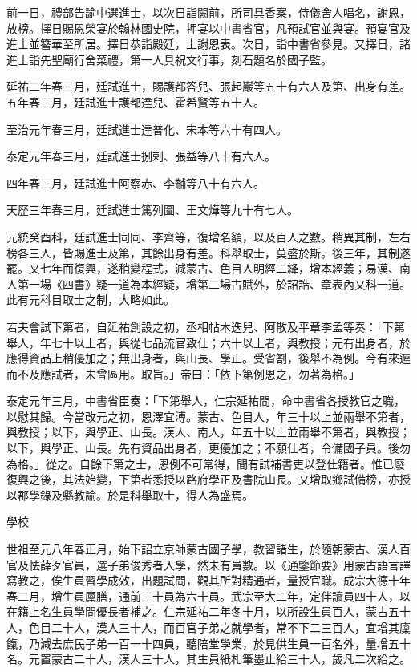 \begin{pinyinscope}
 前一日，禮部告諭中選進士，以次日詣闕前，所司具香案，侍儀舍人唱名，謝恩，放榜。擇日賜恩榮宴於翰林國史院，押宴以中書省官，凡預試官並與宴。預宴官及進士並簪華至所居。擇日恭詣殿廷，上謝恩表。次日，詣中書省參見。又擇日，諸進士詣先聖廟行舍菜禮，第一人具祝文行事，刻石題名於國子監。



 延祐二年春三月，廷試進士，賜護都答兒、張起巖等五十有六人及第、出身有差。五年春三月，廷試進士護都達兒、霍希賢等五十人。



 至治元年春三月，廷試進士達普化、宋本等六十有四人。



 泰定元年春三月，廷試進士捌剌、張益等八十有六人。



 四年春三月，廷試進士阿察赤、李黼等八十有六人。



 天歷三年春三月，廷試進士篤列圖、王文燁等九十有七人。



 元統癸酉科，廷試進士同同、李齊等，復增名額，以及百人之數。稍異其制，左右榜各三人，皆賜進士及第，其餘出身有差。科舉取士，莫盛於斯。後三年，其制遂罷。又七年而復興，遂稍變程式，減蒙古、色目人明經二絳，增本經義；易漢、南人第一場《四書》疑一道為本經疑，增第二場古賦外，於詔誥、章表內又科一道。此有元科目取士之制，大略如此。



 若夫會試下第者，自延祐創設之初，丞相帖木迭兒、阿散及平章李孟等奏：「下第舉人，年七十以上者，與從七品流官致仕；六十以上者，與教授；元有出身者，於應得資品上稍優加之；無出身者，與山長、學正。受省劄，後舉不為例。今有來遲而不及應試者，未曾區用。取旨。」帝曰：「依下第例恩之，勿著為格。」



 泰定元年三月，中書省臣奏：「下第舉人，仁宗延祐間，命中書省各授教官之職，以慰其歸。今當改元之初，恩澤宜溥。蒙古、色目人，年三十以上並兩舉不第者，與教授；以下，與學正、山長。漢人、南人，年五十以上並兩舉不第者，與教授；以下，與學正、山長。先有資品出身者，更優加之；不願仕者，令備國子員。後勿為格。」從之。自餘下第之士，恩例不可常得，間有試補書吏以登仕籍者。惟已廢復興之後，其法始變，下第者悉授以路府學正及書院山長。又增取鄉試備榜，亦授以郡學錄及縣教諭。於是科舉取士，得人為盛焉。



 學校



 世祖至元八年春正月，始下詔立京師蒙古國子學，教習諸生，於隨朝蒙古、漢人百官及怯薛歹官員，選子弟俊秀者入學，然未有員數。以《通鑒節要》用蒙古語言譯寫教之，俟生員習學成效，出題試問，觀其所對精通者，量授官職。成宗大德十年春二月，增生員廩膳，通前三十員為六十員。武宗至大二年，定伴讀員四十人，以在籍上名生員學問優長者補之。仁宗延祐二年冬十月，以所設生員百人，蒙古五十人，色目二十人，漢人三十人，而百官子弟之就學者，常不下二三百人，宜增其廩餼，乃減去庶民子弟一百一十四員，聽陪堂學業，於見供生員一百名外，量增五十名。元置蒙古二十人，漢人三十人，其生員紙札筆墨止給三十人，歲凡二次給之。




\end{pinyinscope}

